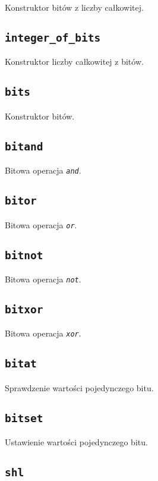 Konstruktor bitów z liczby całkowitej.

\subsection{\texttt{integer\_of\_bits}}

Konstruktor liczby całkowitej z bitów.

\subsection{\texttt{bits}}

Konstruktor bitów.

\subsection{\texttt{bitand}}

Bitowa operacja \emph{\texttt{and}}.

\subsection{\texttt{bitor}}

Bitowa operacja \emph{\texttt{or}}.

\subsection{\texttt{bitnot}}

Bitowa operacja \emph{\texttt{not}}.

\subsection{\texttt{bitxor}}

Bitowa operacja \emph{\texttt{xor}}.

\subsection{\texttt{bitat}}

Sprawdzenie wartości pojedynczego bitu.

\subsection{\texttt{bitset}}

Ustawienie wartości pojedynczego bitu.

\subsection{\texttt{shl}}

